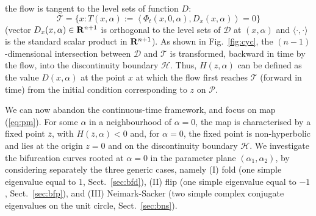 \documentclass[final,onefignum]{siamltex}
\begin{document}
the flow is tangent to the level sets of function $D$:
$$
\mathcal{T}=\{x:T(x,\alpha):=
\left\langle\Phi_t(x,0,\alpha),D_x(x,\alpha)\right\rangle=0\}
$$
(vector $D_x(x,\alpha)\in{{\bf R}}^{n+1}$ is orthogonal to the level sets of
$\mathcal{D}$ at $(x,\alpha)$ and $\langle\cdot,\cdot\rangle$ is the standard
scalar product in ${{\bf R}}^{n+1}$).
As shown in Fig.~\ref{fig:cyc},
the $(n-1)$-dimensional intersection between $\mathcal{D}$ and $\mathcal{T}$
is transformed, backward in time by the flow, into the discontinuity boundary
$\mathcal{H}$.
Thus, $H(z,\alpha)$ can be defined as the value $D(x,\alpha)$ at
the point $x$ at which the flow first reaches $\mathcal{T}$ (forward in time)
from the initial condition corresponding to $z$ on $\mathcal{P}$.

We can now abandon the continuous-time framework, and focus on
map (\ref{eq:pm}).
For some $\alpha$ in a neighbourhood of $\alpha=0$, the map is characterised
by a fixed point $\bar{z}$, with $H(\bar{z},\alpha)<0$ and, for $\alpha=0$,
the fixed point is non-hyperbolic and lies at the origin $z=0$ and on the
discontinuity boundary $\mathcal{H}$.
We investigate the bifurcation curves rooted at $\alpha=0$ in the
parameter plane $(\alpha_1,\alpha_2)$,
by considering separately the three generic cases, namely
(I) fold (one simple eigenvalue equal to $1$, Sect.~\ref{sec:bfd}),
(II) flip (one simple eigenvalue equal to $-1$, Sect.~\ref{sec:bfp}), and
(III) Neimark-Sacker
(two simple complex conjugate eigenvalues on the unit circle,
Sect.~\ref{sec:bns}).
\end{document}
